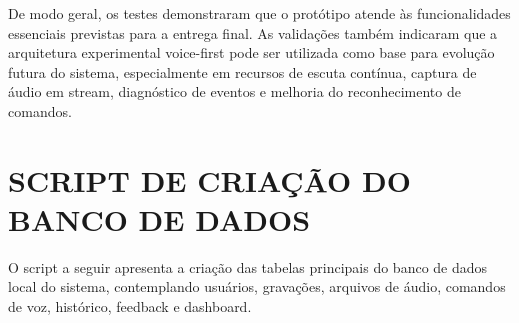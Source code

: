 \documentclass[12pt,oneside,a4paper,brazil,final]{abntex2}
\begin{document}
De modo geral, os testes demonstraram que o protótipo atende às funcionalidades essenciais previstas para a entrega final. As validações também indicaram que a arquitetura experimental voice-first pode ser utilizada como base para evolução futura do sistema, especialmente em recursos de escuta contínua, captura de áudio em stream, diagnóstico de eventos e melhoria do reconhecimento de comandos.



\clearpage

\section{SCRIPT DE CRIAÇÃO DO BANCO DE DADOS}



O script a seguir apresenta a criação das tabelas principais do banco de dados local do sistema, contemplando usuários, gravações, arquivos de áudio, comandos de voz, histórico, feedback e dashboard.
\end{document}
